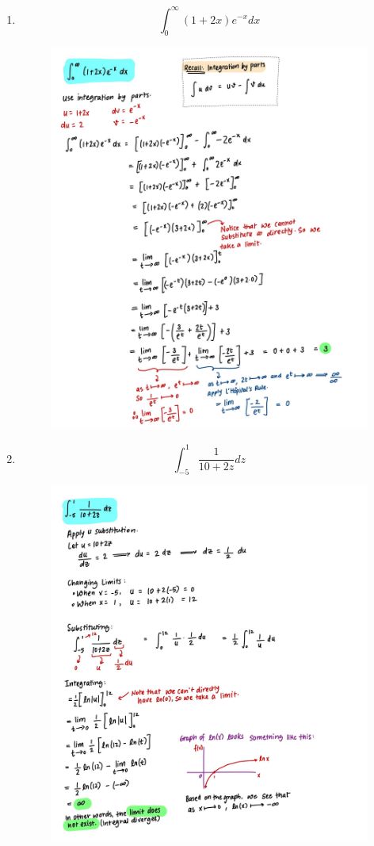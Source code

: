 \documentclass{article}
\begin{document}
\begin{enumerate}
    \item $$\int_0^\infty{(1+2x)e^{-x}}dx$$
    \begin{figure}[H]
        \centering
        \includegraphics[width=0.9\linewidth]{Q1.jpg}
        \label{fig:Q1}
    \end{figure}
    \item $$\int_{-5}^1{\frac{1}{10+2z}}dz$$
    \begin{figure}[H]
        \centering
        \includegraphics[width=\linewidth]{Q2.jpg}

\end{figure}
\end{enumerate}
\end{document}
